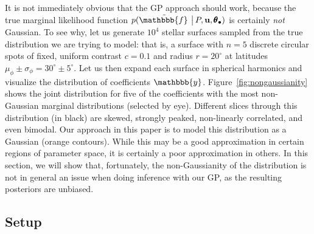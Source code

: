 \documentclass[modern]{aastex62}
\begin{document}
It is not immediately obvious that the GP approach should work, because the
true marginal likelihood function
%
$p ( \tilde{\mathbbb{f}\hspace{0.2em}} \, \big| \, P, \mathbf{u}, \pmb{\theta}_\bullet )$
%
is certainly \emph{not} Gaussian. To see why, let us generate $10^{4}$ stellar
surfaces sampled from the true distribution we are trying to model: that is,
a surface with $n=5$ discrete circular spots of fixed, uniform contrast $c=0.1$
and radius $r=20^\circ$ at latitudes $\mu_\phi \pm \sigma_\phi = 30^\circ \pm 5^\circ$.
Let us then expand each surface in spherical harmonics and visualize the
distribution of coefficients $\mathbbb{y}$. Figure~\ref{fig:nongaussianity}
shows the joint distribution for five of the coefficients with the most
non-Gaussian marginal distributions (selected by eye). Different slices
through this distribution
(in black) are skewed, strongly peaked, non-linearly correlated, and even bimodal.
Our approach in this paper is to model this distribution as a Gaussian
(orange contours). While this may be a good approximation in certain regions
of parameter space, it is certainly a poor approximation in others.
%
In this section, we will show that, fortunately, the non-Gaussianity of the
distribution is not in general an issue when doing inference with our GP,
as the resulting posteriors are unbiased.

\subsection{Setup}
\label{sec:calibration-setup}
\end{document}
